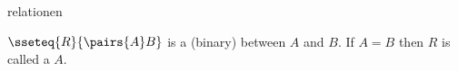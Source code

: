 \documentclass{omdoc}
\begin{document}
\begin{modnl}[creators=miko]{relation}{en}
\begin{definition}[id=relation.def]
  $\sseteq{R}{\pairs{A}B}$ is a (binary)  between $A$ and $B$.
  If $A=B$ then $R$ is called a  $A$.
\end{definition}
\end{modnl}
\end{document}
